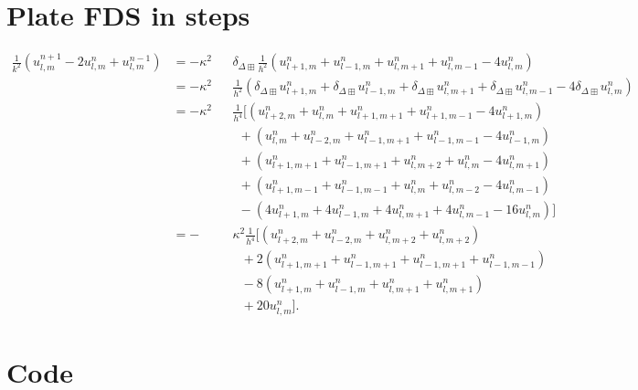 \documentclass{article}
\begin{document}
\section{Plate FDS in steps}\label{app:B}
\begin{equation}\nonumber
\begin{alignedat}{2}
    \frac{1}{k^2}(u_{l,m}^{n+1}-2u_{l,m}^n+u_{l,m}^{n-1}) &=-\kappa^2&&\delta_{\Delta\boxplus}\frac{1}{h^2}(u_{l+1, m}^n + u_{l-1, m}^n + u_{l, m+1}^n + u_{l, m-1}^n - 4 u_{l, m}^n)\\
    &=-\kappa^2&&\frac{1}{h^2}(\delta_{\Delta\boxplus}u_{l+1, m}^n + \delta_{\Delta\boxplus}u_{l-1, m}^n + \delta_{\Delta\boxplus}u_{l, m+1}^n + \delta_{\Delta\boxplus}u_{l, m-1}^n - 4 \delta_{\Delta\boxplus}u_{l, m}^n)\\
    &=-\kappa^2&&\frac{1}{h^4}\big[(u_{l+2, m}^n + u_{l, m}^n + u_{l+1, m+1}^n + u_{l+1, m-1}^n - 4 u_{l+1, m}^n)\\
    & &&\: \:+(u_{l, m}^n + u_{l-2, m}^n + u_{l-1, m+1}^n + u_{l-1, m-1}^n - 4 u_{l-1, m}^n)\\
    & &&\: \:+(u_{l+1, m+1}^n + u_{l-1, m+1}^n + u_{l, m+2}^n + u_{l, m}^n - 4 u_{l, m+1}^n)
    \\
    & &&\: \:+(u_{l+1, m-1}^n + u_{l-1, m-1}^n + u_{l, m}^n + u_{l, m-2}^n - 4 u_{l, m-1}^n)\\
    & &&\: \:-(4u_{l+1, m}^n + 4u_{l-1, m}^n + 4u_{l, m+1}^n + 4u_{l, m-1}^n - 16 u_{l, m}^n)\big]\\
    &=-&&\kappa^2\frac{1}{h^4}\big[(u_{l+2, m}^n + u_{l-2, m}^n+u_{l, m+2}^n+u_{l, m+2}^n)\\
    & &&\ \ \ +2(u_{l+1, m+1}^n + u_{l-1, m+1}^n+u_{l-1, m+1}^n+u_{l-1, m-1}^n)\\
    & &&\ \ \ -8(u_{l+1, m}^n + u_{l-1, m}^n+u_{l, m+1}^n+u_{l, m+1}^n)\\
    & &&\ \ \ +20u_{l,m}^n\big].
    \end{alignedat}
\end{equation}
\section{Code}\label{app:C}


\end{document}
